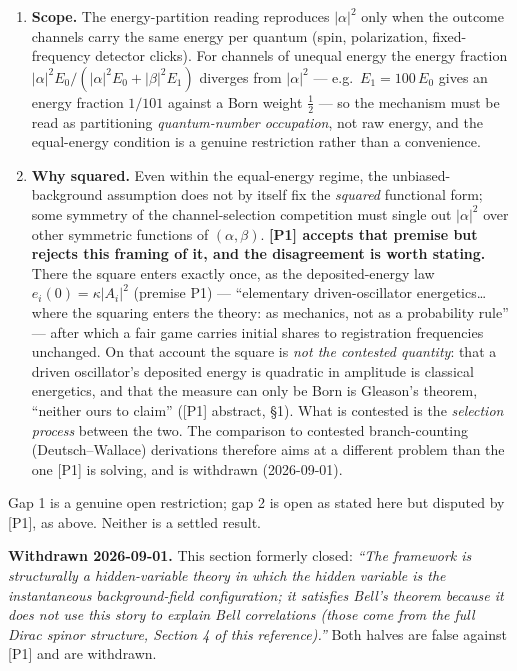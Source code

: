 \documentclass[
]{article}
\begin{document}
\begin{enumerate}
\def\labelenumi{\arabic{enumi}.}
\item
  \textbf{Scope.} The energy-partition reading reproduces \(|\alpha|^2\)
  only when the outcome channels carry the same energy per quantum
  (spin, polarization, fixed-frequency detector clicks). For channels of
  unequal energy the energy fraction
  \(|\alpha|^2 E_0/(|\alpha|^2 E_0 + |\beta|^2 E_1)\) diverges from
  \(|\alpha|^2\) --- e.g.~\(E_1 = 100\,E_0\) gives an energy fraction
  \(1/101\) against a Born weight \(\tfrac12\) --- so the mechanism must
  be read as partitioning \emph{quantum-number occupation}, not raw
  energy, and the equal-energy condition is a genuine restriction rather
  than a convenience.
\item
  \textbf{Why squared.} Even within the equal-energy regime, the
  unbiased-background assumption does not by itself fix the
  \emph{squared} functional form; some symmetry of the channel-selection
  competition must single out \(|\alpha|^2\) over other symmetric
  functions of \((\alpha,\beta)\). \textbf{{[}P1{]} accepts that premise
  but rejects this framing of it, and the disagreement is worth
  stating.} There the square enters exactly once, as the
  deposited-energy law \(e_i(0) = \kappa|A_i|^2\) (premise P1) ---
  ``elementary driven-oscillator energetics\ldots{} where the squaring
  enters the theory: as mechanics, not as a probability rule'' --- after
  which a fair game carries initial shares to registration frequencies
  unchanged. On that account the square is \emph{not the contested
  quantity}: that a driven oscillator's deposited energy is quadratic in
  amplitude is classical energetics, and that the measure can only be
  Born is Gleason's theorem, ``neither ours to claim'' ({[}P1{]}
  abstract, §1). What is contested is the \emph{selection process}
  between the two. The comparison to contested branch-counting
  (Deutsch--Wallace) derivations therefore aims at a different problem
  than the one {[}P1{]} is solving, and is withdrawn (2026-09-01).
\end{enumerate}

Gap 1 is a genuine open restriction; gap 2 is open as stated here but
disputed by {[}P1{]}, as above. Neither is a settled result.

\textbf{Withdrawn 2026-09-01.} This section formerly closed: \emph{``The
framework is structurally a hidden-variable theory in which the hidden
variable is the instantaneous background-field configuration; it
satisfies Bell's theorem because it does not use this story to explain
Bell correlations (those come from the full Dirac spinor structure,
Section 4 of this reference).''} Both halves are false against {[}P1{]}
and are withdrawn.
\end{document}
